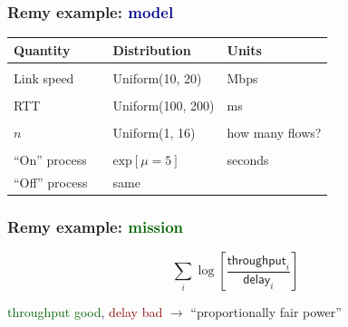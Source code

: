 \documentclass[svgnames]{beamer}
\begin{document}
\begin{frame}
\frametitle{Remy example: \textbf{\textcolor{DarkBlue}{model}}}

\large

\begin{tabular}{llll}
\bf Quantity & & \bf Distribution & \bf Units \\

\hline \\

Link speed & & Uniform(10, 20) & Mbps \\

\\

RTT & & Uniform(100, 200) & ms \\

\\

$n$ & & Uniform(1, 16) & how many flows? \\

\\

``On'' process & & $\mathrm{exp}[\mu = 5]$ & seconds \\

``Off'' process & & same \\

\end{tabular}

\end{frame}

\begin{frame}
\frametitle{Remy example: \textbf{\textcolor{DarkGreen}{mission}}}

\LARGE

\[\sum_i \log \left[ \frac{\textsf{throughput}_i}{\textsf{delay}_i} \right]\]

\vspace{\baselineskip}

\begin{centering}

\textcolor{DarkGreen}{throughput good}, \textcolor{DarkRed}{delay bad} $\rightarrow$ ``proportionally fair power''

\end{centering}

\end{frame}


\end{document}
